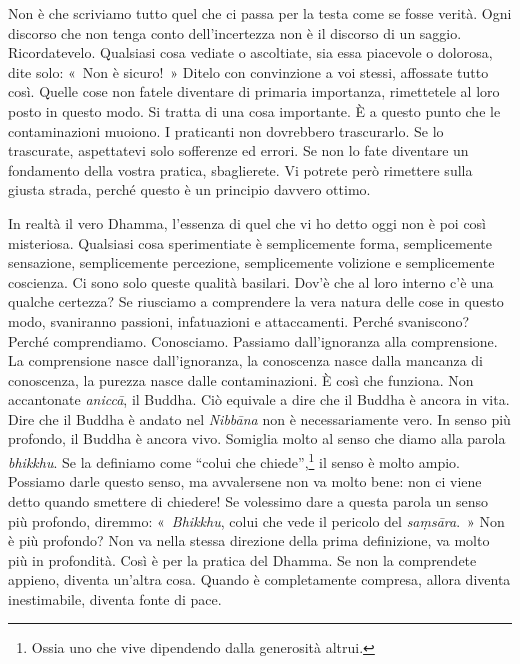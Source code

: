 Non è che scriviamo tutto quel che ci passa per la testa come se fosse
verità. Ogni discorso che non tenga conto dell'incertezza non è il
discorso di un saggio. Ricordatevelo. Qualsiasi cosa vediate o
ascoltiate, sia essa piacevole o dolorosa, dite solo: «~Non è sicuro!~»
Ditelo con convinzione a voi stessi, affossate tutto così. Quelle cose
non fatele diventare di primaria importanza, rimettetele al loro posto
in questo modo. Si tratta di una cosa importante. È a questo punto che
le contaminazioni muoiono. I praticanti non dovrebbero trascurarlo. Se
lo trascurate, aspettatevi solo sofferenze ed errori. Se non lo fate
diventare un fondamento della vostra pratica, sbaglierete. Vi potrete
però rimettere sulla giusta strada, perché questo è un principio davvero
ottimo.

In realtà il vero Dhamma, l'essenza di quel che vi ho detto oggi non è
poi così misteriosa. Qualsiasi cosa sperimentiate è semplicemente forma,
semplicemente sensazione, semplicemente percezione, semplicemente
volizione e semplicemente coscienza. Ci sono solo queste qualità
basilari. Dov'è che al loro interno c'è una qualche certezza? Se
riusciamo a comprendere la vera natura delle cose in questo modo,
svaniranno passioni, infatuazioni e attaccamenti. Perché svaniscono?
Perché comprendiamo. Conosciamo. Passiamo dall'ignoranza alla
comprensione. La comprensione nasce dall'ignoranza, la conoscenza nasce
dalla mancanza di conoscenza, la purezza nasce dalle contaminazioni. È
così che funziona. Non accantonate \emph{aniccā}, il Buddha. Ciò
equivale a dire che il Buddha è ancora in vita. Dire che il Buddha è
andato nel \emph{Nibbāna} non è necessariamente vero. In senso più
profondo, il Buddha è ancora vivo. Somiglia molto al senso che diamo
alla parola \emph{bhikkhu}. Se la definiamo come ``colui che
chiede'',\footnote{Ossia uno che vive dipendendo dalla generosità
  altrui.} il senso è molto ampio. Possiamo darle questo senso, ma
avvalersene non va molto bene: non ci viene detto quando smettere di
chiedere! Se volessimo dare a questa parola un senso più profondo,
diremmo: «~\emph{Bhikkhu}, colui che vede il pericolo del
\emph{saṃsāra}.~» Non è più profondo? Non va nella stessa direzione
della prima definizione, va molto più in profondità. Così è per la
pratica del Dhamma. Se non la comprendete appieno, diventa un'altra
cosa. Quando è completamente compresa, allora diventa inestimabile,
diventa fonte di pace.

